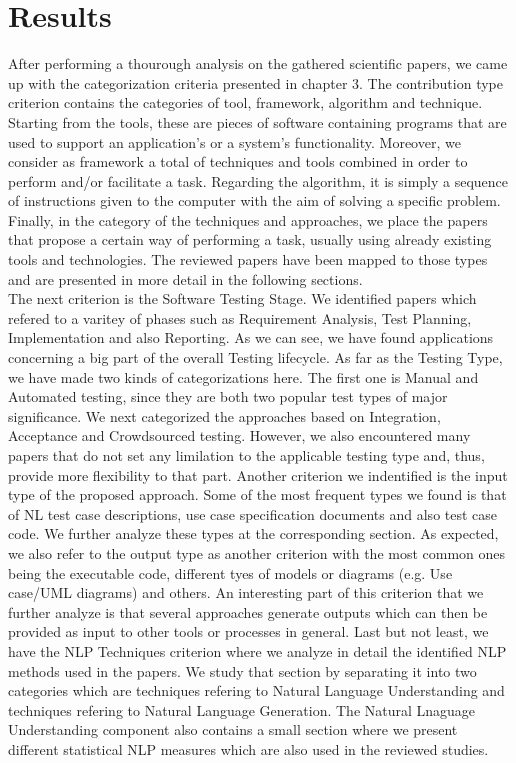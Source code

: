 \section {Results}

After performing a thourough analysis on the gathered scientific papers, we came up with the categorization criteria presented in chapter 3. The contribution type criterion contains the categories 
of tool, framework, algorithm and technique. Starting from the tools, these are pieces of software containing programs that are used to support an application's or a system's functionality. 
Moreover, we consider as framework a total of techniques and tools combined in order to perform and/or facilitate a task. Regarding the algorithm, it is simply a sequence of instructions given 
to the computer with the aim of solving a specific problem. Finally, in the category of the techniques and approaches, we place the papers that propose a certain way of performing a task, usually 
using already existing tools and technologies. The reviewed papers have been mapped to those types and are presented in more detail in the following sections. \\

The next criterion is the Software Testing Stage. We identified papers which refered to a varitey of phases such as Requirement Analysis, Test Planning, Implementation and also 
Reporting. As we can see, we have found applications concerning a big part of the overall Testing lifecycle. As far as the Testing Type, we have made two kinds of categorizations here. 
The first one is Manual and Automated testing, since they are both two popular test types of major significance. We next categorized the approaches based on Integration, Acceptance and Crowdsourced testing. 
However, we also encountered many papers that do not set any limilation to the applicable testing type and, thus, provide more flexibility to that part. Another criterion we indentified is the input type of 
the proposed approach. Some of the most frequent types we found is that of NL test case descriptions, use case specification documents and also test case code. We further analyze these types at the 
corresponding section. As expected, we also refer to the output type as another criterion with the most common ones being the executable code, different tyes of models or diagrams (e.g. Use case/UML diagrams) and 
others. An interesting part of this criterion that we further analyze is that several approaches generate outputs which can then be provided as input to other tools or processes in general. Last but not least, we 
have the NLP Techniques criterion where we analyze in detail the identified NLP methods used in the papers. We study that section by separating it into two categories which are techniques refering to Natural 
Language Understanding and techniques refering to Natural Language Generation. The Natural Lnaguage Understanding component also contains a small section where we present different statistical NLP measures which 
are also used in the reviewed studies.\\

